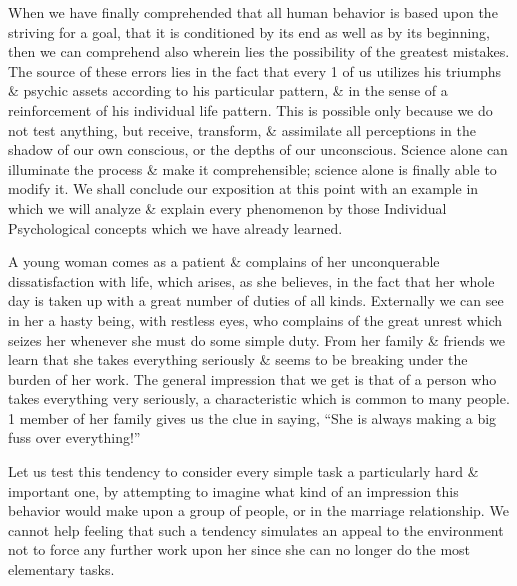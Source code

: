 \documentclass{article}
\begin{document}
When we have finally comprehended that all human behavior is based upon the striving for a goal, that it is conditioned by its end as well as by its beginning, then we can comprehend also wherein lies the possibility of the greatest mistakes. The source of these errors lies in the fact that every 1 of us utilizes his triumphs \& psychic assets according to his particular pattern, \& in the sense of a reinforcement of his individual life pattern. This is possible only because we do not test anything, but receive, transform, \& assimilate all perceptions in the shadow of our own conscious, or the depths of our unconscious. Science alone can illuminate the process \& make it comprehensible; science alone is finally able to modify it. We shall conclude our exposition at this point with an example in which we will analyze \& explain every phenomenon by those Individual Psychological concepts which we have already learned.

A young woman comes as a patient \& complains of her unconquerable dissatisfaction with life, which arises, as she believes, in the fact that her whole day is taken up with a great number of duties of all kinds. Externally we can see in her a hasty being, with restless eyes, who complains of the great unrest which seizes her whenever she must do some simple duty. From her family \& friends we learn that she takes everything seriously \& seems to be breaking under the burden of her work. The general impression that we get is that of a person who takes everything very seriously, a characteristic which is common to many people. 1 member of her family gives us the clue in saying, ``She is always making a big fuss over everything!''

Let us test this tendency to consider every simple task a particularly hard \& important one, by attempting to imagine what kind of an impression this behavior would make upon a group of people, or in the marriage relationship. We cannot help feeling that such a tendency simulates an appeal to the environment not to force any further work upon her since she can no longer do the most elementary tasks.
\end{document}
